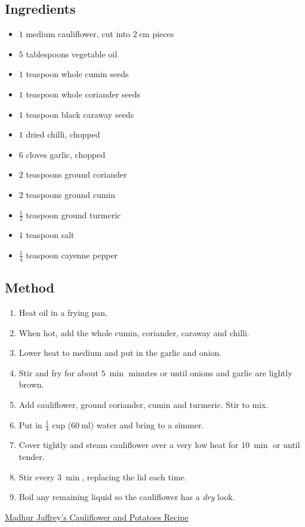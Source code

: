 \documentclass[11pt,a4paper]{article}
\begin{document}
\subsection*{Ingredients}

\begin{multicols}{2}

\begin{itemize}
  \item $ 1 $ medium cauliflower, cut into $ \qty{2}{\cm} $ pieces
  \item $ 5 $ tablespoons vegetable oil
  \item $ 1 $ teaspoon whole cumin seeds
  \item $ 1 $ teaspoon whole coriander seeds
  \item $ 1 $ teaspoon black caraway seeds
  \item $ 1 $ dried chilli, chopped
\end{itemize}

\columnbreak{}

\begin{itemize}
  \item $ 6 $ cloves garlic, chopped
  \item $ 2 $ teaspoons ground coriander
  \item $ 2 $ teaspoons ground cumin
  \item $ \frac{1}{2} $ teaspoon ground turmeric
  \item $ 1 $ teaspoon salt
  \item $ \frac{1}{4} $ teaspoon cayenne pepper
\end{itemize}

\end{multicols}

\medskip

\subsection*{Method}

\begin{enumerate}
  \item Heat oil in a frying pan.
  \item When hot, add the whole cumin, coriander, caraway and chilli.
  \item Lower heat to medium and put in the garlic and onion.
  \item Stir and fry for about $ \qty{5}{\min} $ minutes or until onions and garlic are lightly brown.
  \item Add cauliflower, ground coriander, cumin and turmeric. Stir to mix.
  \item Put in $ \frac{1}{4} $ cup ($ \qty{60}{\ml} $) water and bring to a simmer.
  \item Cover tightly and steam cauliflower over a very low heat for $ \qty{10}{\min} $ or until tender.
  \item Stir every $ \qty{3}{\min} $, replacing the lid each time.
  \item Boil any remaining liquid so the cauliflower has a \textit{dry} look.
\end{enumerate}

\href{https://www.masterclass.com/articles/indian-cauliflower-recipe-by-madhur-jaffrey}{Madhur Jaffrey's Cauliflower and Potatoes Recipe}
\end{document}
